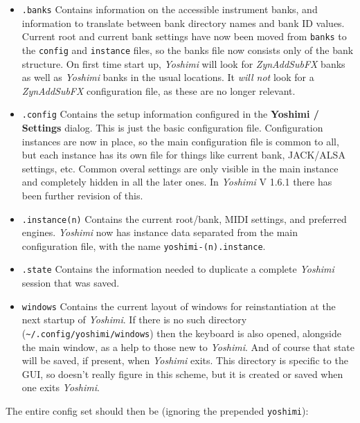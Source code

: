    \begin{itemize}
      \item \texttt{.banks}
         Contains information on the accessible instrument banks, and
         information to translate between bank directory names and bank ID
         values.
         Current root and current bank settings have now been moved from
         \texttt{banks} to the \texttt{config} and \texttt{instance}
         files, so the banks file now consists only of the bank structure.
         On first time start up, \textsl{Yoshimi} will look for
         \textsl{ZynAddSubFX} banks as well as \textsl{Yoshimi} banks in the
         usual locations. It \textsl{will not} look for a \textsl{ZynAddSubFX}
         configuration file, as these are no longer relevant.
      \item \texttt{.config}
         Contains the setup information configured in the
         \textbf{Yoshimi / Settings} dialog.
         This is just the basic configuration file.
         Configuration instances are now in place, so the main configuration
         file is common to all, but each instance has its own file for things
         like current bank, JACK/ALSA settings, etc.
         Common overal settings are only visible in the main instance and
         completely hidden in all the later ones.
         In \textsl{Yoshimi} V 1.6.1 there has been further revision of this.
      \item \texttt{.instance(n)}
         Contains the current root/bank, MIDI settings, and preferred engines.
         \textsl{Yoshimi} now has instance data separated from the main
         configuration file, with the name \texttt{yoshimi-(n).instance}.
      \item \texttt{.state}
         Contains the information needed to duplicate a complete \textsl{Yoshimi}
         session that was saved.
      \item \texttt{windows}
         Contains the current layout of windows for reinstantiation at the next
         startup of \textsl{Yoshimi}.
         If there is no such directory
         (\texttt{\textasciitilde/.config/yoshimi/windows}) then the
         keyboard is also opened, alongside the main window, as a help to those
         new to \textsl{Yoshimi}.
         And of course that state will be saved, if present, when
         \textsl{Yoshimi} exits.
         This directory is specific to the GUI, so doesn't really figure in
         this scheme, but it is created or saved when one exits
         \textsl{Yoshimi}.
   \end{itemize}
   The entire config set should then be (ignoring the prepended
   \texttt{yoshimi}):

